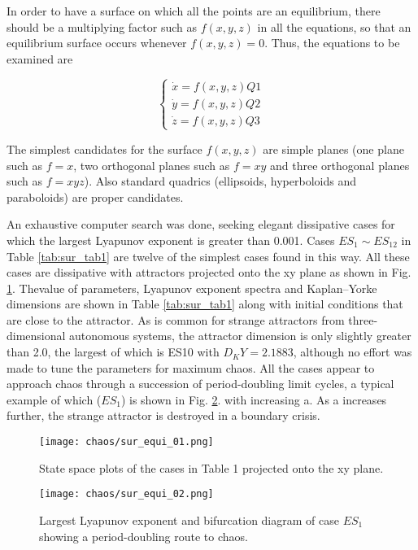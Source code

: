 In order to have a surface on which all the points are an
equilibrium, there should be a multiplying factor such
as \(f(x, y, z)\) in all the equations, so that an equilibrium
surface occurs whenever \(f(x, y, z) = 0\). Thus, the
equations to be examined are

\begin{equation}
\label{eq:sur_eq3}
  \left\{
  \begin{array}{l}
    \dot{x} = f(x, y, z) Q1\\
    \dot{y} = f(x, y, z) Q2\\
    \dot{z} = f(x, y, z) Q3
  \end{array}
  \right.
\end{equation}

The simplest candidates for the surface \(f(x, y, z)\) are
simple planes (one plane such as \(f = x\), two orthogonal
planes such as \(f = xy\) and three orthogonal
planes such as \(f = xyz\)). Also standard quadrics
(ellipsoids, hyperboloids and paraboloids) are proper
candidates.

An exhaustive computer search was done, seeking
elegant\cite{01_Sprott2010Elegant}  
dissipative cases for which the largest Lyapunov
exponent is greater than 0.001. Cases \(ES_1\sim{}ES_{12}\)
in Table \ref{tab:sur_tab1} are twelve of the simplest cases found in this
way. All these cases are dissipative with attractors projected
onto the xy plane as shown in Fig. \ref{fig:sur_fig1}. Thevalue of
parameters, Lyapunov exponent spectra and Kaplan–Yorke 
dimensions are shown in Table \ref{tab:sur_tab1} along with
initial conditions that are close to the attractor. As is
common for strange attractors from three-dimensional
autonomous systems, the attractor dimension is only
slightly greater than 2.0, the largest of which is ES10
with \(D_KY = 2.1883\), although no effort was made
to tune the parameters for maximum chaos. All the
cases appear to approach chaos through a succession
of period-doubling limit cycles, a typical example of
which (\(ES_1\)) is shown in Fig. \ref{fig:sur_fig2}. with increasing a. As
a increases further, the strange attractor is destroyed in
a boundary crisis.

\begin{figure}[htbp]
\centering
\texttt{[image: chaos/sur\_equi\_01.png]}
\caption{\label{fig:sur_fig1}
State space plots of the cases in Table 1 projected onto the xy plane.}
\end{figure}

\begin{figure}[htbp]
\centering
\texttt{[image: chaos/sur\_equi\_02.png]}
\caption{\label{fig:sur_fig2}
Largest Lyapunov exponent and bifurcation diagram of case $ES_1$
showing a period-doubling route to chaos.}
\end{figure}

